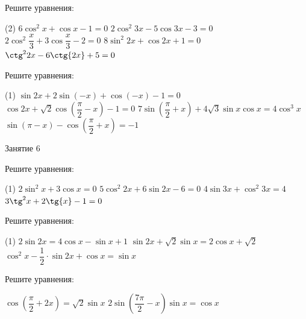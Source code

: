 \begin{class}[number=5]
	\begin{listofex}
		\item Решите уравнения:
		\begin{tasks}(2)
			\task \( 6\cos^2{x}+\cos{x}-1=0 \)
			\task \( 2\cos^2{3x}-5\cos{3x}-3=0 \)
			\task \( 2\cos^2{\dfrac{x}{3}}+3\cos{\dfrac{x}{3}}-2=0 \)
			\task \( 8\sin^2{2x}+\cos{2x}+1=0 \)
			\task \( \ctg^2{2x}-6\ctg{2x}+5=0 \)
		\end{tasks}
		\item Решите уравнения:
		\begin{tasks}(1)
			\task \( \sin{2x}+2\sin{(-x)}+\cos{(-x)}-1=0 \)
			\task \( \cos{2x}+\sqrt{2}\cos{\left( \dfrac{\pi}{2}-x \right)}-1=0 \)
			\task \( 7\sin{ \left( \dfrac{\pi}{2}+x \right) +4\sqrt{3}\sin{x} \cos{x} = 4 \cos^3{x}  } \)
			\task \( \sin{(\pi-x)}- \cos{\left( \dfrac{\pi}{2}+x \right) = -1 }  \)
		\end{tasks}
	\end{listofex}
\end{class}

\begin{class}[number=6]
	\begin{listofex}
		\item Занятие 6
	\end{listofex}
\end{class}

\begin{homework}[number=3]
	\begin{listofex}
		\item Решите уравнения:
		\begin{tasks}(1)
			\task \( 2\sin^2x+3\cos{x}=0 \)
			\task \( 5\cos^2{2x}+6\sin{2x}-6=0 \)
			\task \( 4\sin{3x}+\cos^2{3x}=4 \)
			\task \( 3\tg^2{x}+2\tg{x}-1=0 \)
		\end{tasks}
		\item Решите уравнения:
		\begin{tasks}(1)
			\task \( 2\sin{2x}=4\cos{x}-\sin{x}+1 \)
			\task \( \sin{2x}+\sqrt{2}\sin{x}=2\cos{x}+\sqrt{2} \)
			\task \( \cos^2{x}-\dfrac{1}{2} \cdot \sin{2x} + \cos{x} = \sin{x} \)
		\end{tasks}
		\item Решите уравнения:
		\begin{tasks}
			\task \( \cos{\left( \dfrac{\pi}{2}+2x \right)} = \sqrt{2} \sin{x} \)
			\task \( 2\sin{ \left( \dfrac{7\pi}{2}-x \right)} \sin{x}=\cos{x} \)
		\end{tasks}
	\end{listofex}
\end{homework}


